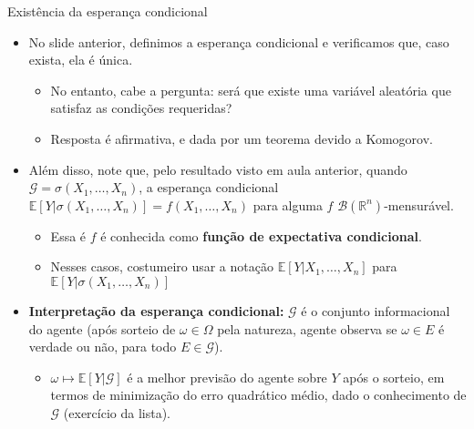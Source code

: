\documentclass[11pt]{beamer}
\begin{document}
	
		\begin{frame}{Existência da esperança condicional}
		\begin{itemize}
			\item No slide anterior, definimos a esperança condicional e verificamos que, caso exista, ela é única.
			\begin{itemize}
				\item No entanto, cabe a pergunta: será que existe uma variável aleatória que satisfaz as condições requeridas?
						\item Resposta é {\color{red}afirmativa}, e dada por um teorema devido a Komogorov.
			\end{itemize}
			\item Além disso, note que, pelo resultado visto em aula anterior, quando $\mathcal{G} = \sigma(X_1,\ldots, X_n)$, a esperança condicional $\mathbb{E}[Y|\sigma(X_1,\ldots, X_n)] = f(X_1,\ldots,X_n)$ para alguma $f$ $\mathcal{B}(\mathbb{R}^n)$-mensurável.
			\begin{itemize}
				\item Essa é $f$ é conhecida como \textbf{função de expectativa condicional}.
				\item Nesses casos, costumeiro usar a notação $\mathbb{E}[Y|X_1,\ldots, X_n]$ para $\mathbb{E}[Y|\sigma(X_1,\ldots, X_n)]  $
			\end{itemize}
			\item \textbf{Interpretação da esperança condicional:} $\mathcal{G}$ é o conjunto informacional do agente (após sorteio de $\omega \in \Omega$ pela natureza, agente observa se $\omega \in E$ é verdade ou não, para todo $E \in \mathcal{G}$).
			\begin{itemize}
				\item $\omega \mapsto \mathbb{E}[Y|\mathcal{G}]$ é a melhor previsão do agente sobre $Y$ após o sorteio, em termos de minimização do erro quadrático médio, dado o conhecimento de $\mathcal{G}$ (exercício da lista).
			\end{itemize}
		\end{itemize}
	\end{frame}
\end{document}
